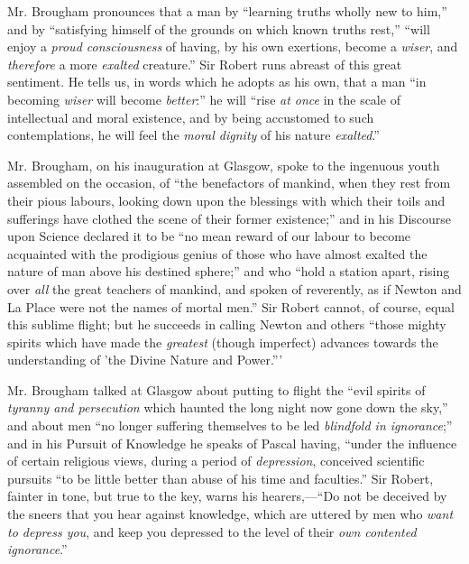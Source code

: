 Mr. Brougham pronounces that a man by ``learning truths wholly
new to him,'' and by ``satisfying himself of the grounds on
which known truths rest,'' ``will enjoy a \emph{proud
consciousness} of having, by his own exertions, become a \emph{wiser},
and \emph{therefore} a more \emph{exalted} creature.'' Sir Robert
runs abreast of this great sentiment. He tells us, in words which he
adopts as his own, that a man ``in becoming \emph{wiser} will
become \emph{better}:'' he will ``rise \emph{at once} in the
scale of intellectual and moral existence, and by being accustomed to
such contemplations, he will feel the \emph{moral dignity} of his
nature \emph{exalted}.''

Mr. Brougham, on his inauguration at Glasgow, spoke to the
ingenuous youth assembled on the occasion, of ``the benefactors of
mankind, when they rest from their pious labours, looking down upon
the blessings with which their toils and sufferings have clothed the
scene of their former existence;'' and in his Discourse upon
Science declared it to be ``no mean reward of our labour to become
acquainted with the prodigious genius of those who have almost exalted
the nature of man above his destined sphere;'' and who ``hold
a station apart, rising over \emph{all} the great teachers of mankind,
and spoken of reverently, as if Newton and La Place were not the names
of mortal men.'' Sir Robert cannot, of course, equal this sublime
flight; but he succeeds in calling Newton and others ``those
mighty spirits which have made the \emph{greatest} (though imperfect)
advances towards the understanding of 'the Divine Nature and
Power.'''

Mr. Brougham talked at Glasgow about putting to flight the
``evil spirits of \emph{tyranny and persecution} which haunted the
long night now gone down the sky,'' and about men ``no longer
suffering themselves to be led \emph{blindfold in ignorance};''
and in his Pursuit of Knowledge he speaks of Pascal having,
``under the influence of certain religious views, during a period
of \emph{depression}, conceived scientific pursuits ``to be
little better than abuse of his time and faculties.'' Sir Robert,
fainter in tone, but true to the key, warns his hearers,—``Do
not be deceived by the sneers that you hear against knowledge, which
are uttered by men who \emph{want to depress you}, and keep you
depressed to the level of their \emph{own contented ignorance}.''

